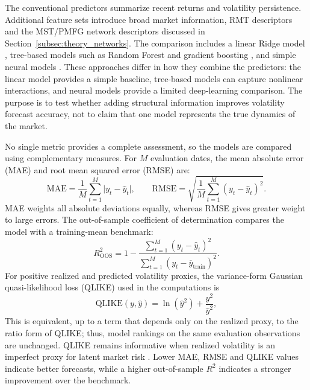 The conventional predictors summarize recent returns and volatility persistence. Additional feature sets introduce broad market information, RMT descriptors and the MST/PMFG network descriptors discussed in Section~\ref{subsec:theory_networks}. The comparison includes a linear Ridge model \cite{hoerl_kennard_1970_ridge}, tree-based models such as Random Forest and gradient boosting \cite{breiman_2001_random,friedman_2001_greedy}, and simple neural models \cite{bucci_2020_realized,christensen_2022_realized}. These approaches differ in how they combine the predictors: the linear model provides a simple baseline, tree-based models can capture nonlinear interactions, and neural models provide a limited deep-learning comparison. The purpose is to test whether adding structural information improves volatility forecast accuracy, not to claim that one model represents the true dynamics of the market.

No single metric provides a complete assessment, so the models are compared using complementary measures. For $M$ evaluation dates, the mean absolute error (MAE) and root mean squared error (RMSE) are:
\begin{equation}
\mathrm{MAE}=\frac{1}{M}\sum_{t=1}^{M}\lvert y_t-\widehat{y}_t\rvert,
\qquad
\mathrm{RMSE}=\sqrt{\frac{1}{M}\sum_{t=1}^{M}(y_t-\widehat{y}_t)^2}.
\label{eq:theory_mae_rmse}
\end{equation}
MAE weights all absolute deviations equally, whereas RMSE gives greater weight to large errors. The out-of-sample coefficient of determination compares the model with a training-mean benchmark:
\begin{equation}
R_{\mathrm{OOS}}^2 = 1 - \frac{\sum_{t=1}^{M}(y_t-\widehat{y}_t)^2}{\sum_{t=1}^{M}(y_t-\overline{y}_{\mathrm{train}})^2}.
\label{eq:theory_oos_r2}
\end{equation}
For positive realized and predicted volatility proxies, the variance-form Gaussian quasi-likelihood loss (QLIKE) used in the computations is
\begin{equation}
\mathrm{QLIKE}(y,\widehat{y}) = \ln(\widehat{y}^{2})+\frac{y^{2}}{\widehat{y}^{2}},
\label{eq:theory_qlike}
\end{equation}
This is equivalent, up to a term that depends only on the realized proxy, to the ratio form of QLIKE; thus, model rankings on the same evaluation observations are unchanged. QLIKE remains informative when realized volatility is an imperfect proxy for latent market risk \cite{patton_2011_volatility}. Lower MAE, RMSE and QLIKE values indicate better forecasts, while a higher out-of-sample $R^2$ indicates a stronger improvement over the benchmark.

